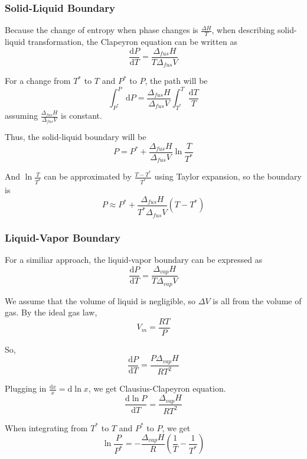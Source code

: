 \documentclass[letterpaper]{article}
\newcommand{\diff}{\mathrm{d}}
\begin{document}
\subsubsection*{Solid-Liquid Boundary}
Because the change of entropy when phase changes is $\frac{\Delta H}{T}$, when describing solid-liquid
transformation, the Clapeyron equation can be written as
\begin{equation*}
    \frac{\diff P}{\diff T}=\frac{\Delta_{fus}H}{T\Delta_{fus}V}
\end{equation*}

For a change from $T^*$ to $T$ and $P^*$ to $P$, the path will be
\begin{equation*}
    \int_{P^*}^{P}\diff P=\frac{\Delta_{fus}H}{\Delta_{fus}V}\int_{T^*}^{T}\frac{\diff T}{T}
\end{equation*}
assuming $\frac{\Delta_{fus}H}{\Delta_{fus}V}$ is constant.

Thus, the solid-liquid boundary will be
\begin{equation*}
    P=P^*+\frac{\Delta_{fus}H}{\Delta_{fus}V}\ln\frac{T}{T^*}
\end{equation*}

And $\ln\frac{T}{T^*}$ can be approximated by $\frac{T-T^*}{T^*}$ using Taylor expansion, so the boundary
is
\begin{equation*}
    P\approx P^*+\frac{\Delta_{fus}H}{T^*\Delta_{fus}V}(T-T^*)
\end{equation*}
\subsubsection*{Liquid-Vapor Boundary}
For a similiar approach, the liquid-vapor boundary can be expressed as
\begin{equation*}
    \frac{\diff P}{\diff T}=\frac{\Delta_{vap}H}{T\Delta_{vap}V}
\end{equation*}

We assume that the volume of liquid is negligible, so $\Delta V$ is all from
the volume of gas. By the ideal gas law,
\begin{equation*}
    V_m=\frac{RT}{P}
\end{equation*}

So,
\begin{equation*}
    \frac{\diff P}{\diff T}=\frac{P\Delta_{vap}H}{RT^2}
\end{equation*}

Plugging in $\frac{\diff x}{x}=\diff\ln x$, we get Clausius-Clapeyron equation.
\begin{equation*}
    \boxed{\frac{\diff\ln P}{\diff T}=\frac{\Delta_{vap}H}{RT^2}}
\end{equation*}

When integrating from $T^*$ to $T$ and $P^*$ to $P$, we get
\begin{equation*}
    \ln\frac{P}{P^*}=-\frac{\Delta_{vap}H}{R}\left(\frac{1}{T}-\frac{1}{T^*}\right)
\end{equation*}
\end{document}
